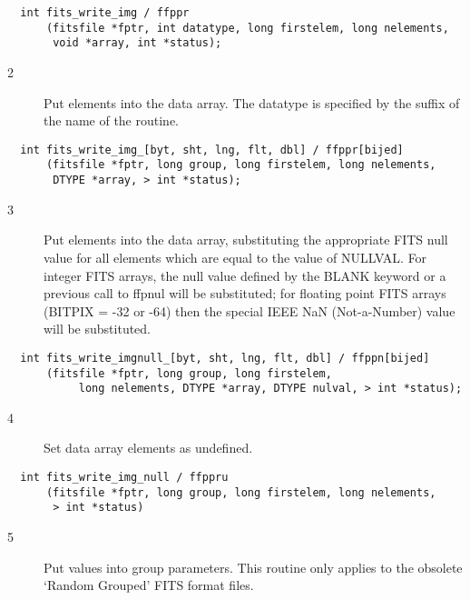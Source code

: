 \begin{verbatim}
  int fits_write_img / ffppr
      (fitsfile *fptr, int datatype, long firstelem, long nelements,
       void *array, int *status);
\end{verbatim}

\begin{description}
\item[2 ] Put elements into the data array.  The datatype is specified
   by the suffix of the name of the routine.
\end{description}

\begin{verbatim}
  int fits_write_img_[byt, sht, lng, flt, dbl] / ffppr[bijed]
      (fitsfile *fptr, long group, long firstelem, long nelements,
       DTYPE *array, > int *status);
\end{verbatim}

\begin{description}
\item[3 ]Put elements into the data array, substituting the appropriate FITS null
   value for all elements which are equal to the value of NULLVAL.  For
   integer FITS arrays, the null value defined by the BLANK keyword or
   a previous call to ffpnul
   will be substituted;  for floating point FITS arrays (BITPIX = -32
   or -64) then the special IEEE NaN (Not-a-Number) value will be
  substituted.
\end{description}

\begin{verbatim}
  int fits_write_imgnull_[byt, sht, lng, flt, dbl] / ffppn[bijed]
      (fitsfile *fptr, long group, long firstelem,
           long nelements, DTYPE *array, DTYPE nulval, > int *status);
\end{verbatim}

\begin{description}
\item[4 ]Set data array elements as undefined.
\end{description}

\begin{verbatim}
  int fits_write_img_null / ffppru
      (fitsfile *fptr, long group, long firstelem, long nelements,
       > int *status)
\end{verbatim}

\begin{description}
\item[5 ] Put values into group parameters.  This routine only applies
   to the obsolete `Random Grouped' FITS format files.
\end{description}

